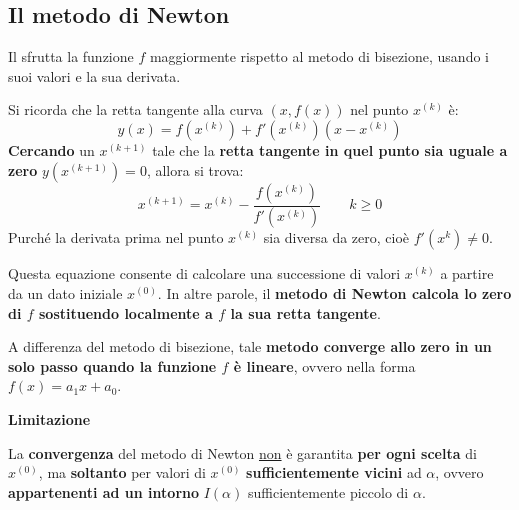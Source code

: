 \subsection{Il metodo di Newton}

Il  sfrutta la funzione $f$ maggiormente rispetto al metodo di bisezione, usando i suoi valori e la sua derivata.

\highspace
Si ricorda che la retta tangente alla curva $\left(x, f\left(x\right)\right)$ nel punto $x^{(k)}$ è:
\begin{equation*}
    y\left(x\right) = f\left(x^{(k)}\right) + f'\left(x^{(k)}\right)\left(x-x^{(k)}\right)
\end{equation*}
\textbf{Cercando} un $x^{\left(k+1\right)}$ tale che la \textbf{retta tangente in quel punto sia uguale a zero} $y\left(x^{\left(k+1\right)}\right) = 0$, allora si trova:
\begin{equation}\label{eq: metodo di Newton}
    x^{\left(k+1\right)} = x^{\left(k\right)} - \dfrac{f\left(x^{\left(k\right)}\right)}{f'\left(x^{\left(k\right)}\right)} \hspace{2em} k \ge 0
\end{equation}
Purché la derivata prima nel punto $x^{(k)}$ sia diversa da zero, cioè $f'\left(x^{k}\right) \ne 0$.

\highspace
Questa equazione consente di calcolare una successione di valori $x^{(k)}$ a partire da un dato iniziale $x^{(0)}$. In altre parole, il \textbf{metodo di Newton calcola lo zero di $f$ sostituendo localmente a $f$ la sua retta tangente}.

\highspace
A differenza del metodo di bisezione, tale \textbf{metodo converge allo zero in un solo passo quando la funzione $f$ è lineare}, ovvero nella forma $f\left(x\right) = a_{1}x + a_{0}$.

\begin{flushleft}
    \textcolor{Red2}{ \textbf{Limitazione}}
\end{flushleft}
La \textbf{convergenza} del metodo di Newton \underline{non} è garantita \textbf{per ogni scelta} di $x^{(0)}$, ma \textbf{soltanto} per valori di $x^{(0)}$ \textbf{sufficientemente vicini} ad $\alpha$, ovvero \textbf{appartenenti ad un intorno} $I\left(\alpha\right)$ sufficientemente piccolo di $\alpha$.

